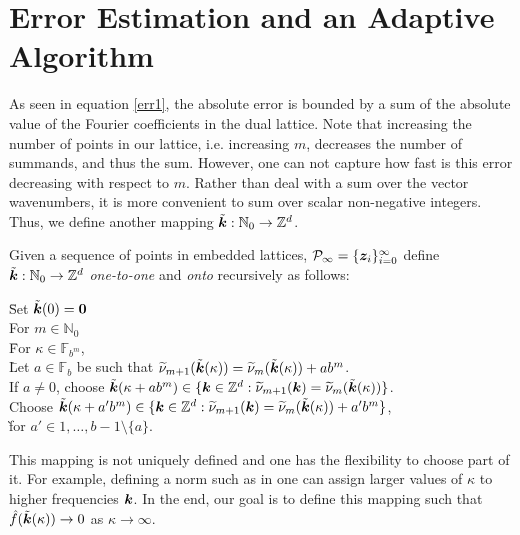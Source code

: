 \documentclass[graybox]{svmult}
\newcommand{\Z}{\mathbb{Z}} %
\newcommand{\N}{\mathbb{N}} %
\newcommand{\F}{\mathbb{F}} %
\newcommand{\bszero}{\boldsymbol{0}} %
\newcommand{\bsz}{\boldsymbol{z}}    %
\begin{document}
\section{Error Estimation and an Adaptive Algorithm}\label{secalgo}

As seen in equation \eqref{err1}, the absolute error is bounded by a sum of the absolute value of the Fourier coefficients in the dual lattice. Note that increasing the number of points in our lattice, i.e. increasing $m$, decreases the number of summands, and thus the sum. However, one can not capture how fast is this error decreasing with respect to $m$.  Rather than deal with a sum over the vector wavenumbers, it is more convenient to sum over scalar non-negative integers.  Thus, we define another mapping $\tvk: \N_0 \to \Z^d$.

\begin{definition} \label{wavenummapdef} Given a sequence of points in embedded lattices, $\cp_{\infty} = \{\bsz_i\}_{i=0}^{\infty}$ define $\tvk: \N_0 \to \Z^d$ \emph{one-to-one} and \emph{onto} recursively as follows:
\begin{tabbing}
\hspace{0.5cm} \= Set $\tvk(0)=\bszero$ \+ \\
For $m\in \N_0$ \\
\hspace{0.3cm} \= For $\kappa \in \F_{b^m}$,  \+ \\
\hspace{0.3cm} \= Let $a\in \F_b$ be such that $\widetilde{\nu}_{m+1}(\tilde{\boldsymbol{k}}(\kappa))= \widetilde{\nu}_{m}(\tilde{\boldsymbol{k}}(\kappa)) + ab^m$. \+ \\
If $a\ne 0$, choose $\tvk(\kappa+a b^m) \in \{\bsk \in  \Z^d : \tnu_{m+1}(\bsk)=\tnu_{m}(\tvk(\kappa))\}$. \\
Choose $\tvk(\kappa+a' b^m) \in \{\bsk \in  \Z^d : \tnu_{m+1}(\bsk)=\tnu_{m}(\tvk(\kappa))+a' b^m \}$, \\ \` for  $a'\in {1, \ldots, b-1}\setminus \{a\}$.
\end{tabbing}
\end{definition}

This mapping is not uniquely defined and one has the flexibility to choose part of it. For example, defining a norm such as in \cite[Chap. 4]{SloJoe94} one can assign larger values of $\kappa$ to higher frequencies $\boldsymbol{k}$. In the end, our goal is to define this mapping such that $\hat{f}(\tilde{\boldsymbol{k}}(\kappa))\rightarrow 0$ as $\kappa \to \infty$.
\end{document}
